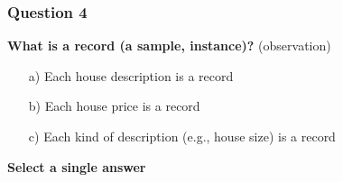 \documentclass{beamer}
\begin{document}
\begin{frame}
	\frametitle{Question 4}
	
	\textbf{What is a record (a sample, instance)?} (observation)
	
	\begin{enumerate}
		\item[a)] Each house description is a record
		\item[b)] Each house price is a record
		\item[c)] Each kind of description (e.g., house size) is a record
	\end{enumerate}
	
	\vspace{0.5cm}
	
	\textbf{Select a single answer}
	
\end{frame}
	
\end{document}
